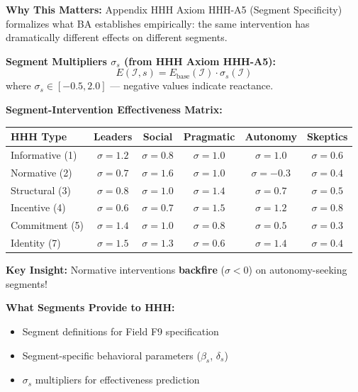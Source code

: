 \begin{tcolorbox}[colback=orange!5!white, colframe=orange!75!black,
    title=\textbf{Integration: Segments $\leftrightarrow$ HHH (Intervention Toolkit)}]

\textbf{Why This Matters:}
Appendix HHH Axiom HHH-A5 (Segment Specificity) formalizes what BA establishes empirically:
the same intervention has dramatically different effects on different segments.

\textbf{Segment Multipliers $\sigma_s$ (from HHH Axiom HHH-A5):}
\begin{equation}
E(\mathcal{I}, s) = E_{\text{base}}(\mathcal{I}) \cdot \sigma_s(\mathcal{I})
\end{equation}
where $\sigma_s \in [-0.5, 2.0]$ --- negative values indicate reactance.

\textbf{Segment-Intervention Effectiveness Matrix:}
\begin{center}
\renewcommand{\arraystretch}{1.2}
\footnotesize
\begin{tabular}{@{}lccccc@{}}
\toprule
\textbf{HHH Type} & \textbf{Leaders} & \textbf{Social} & \textbf{Pragmatic} & \textbf{Autonomy} & \textbf{Skeptics} \\
\midrule
Informative (1) & $\sigma=1.2$ & $\sigma=0.8$ & $\sigma=1.0$ & $\sigma=1.0$ & $\sigma=0.6$ \\
Normative (2) & $\sigma=0.7$ & $\sigma=1.6$ & $\sigma=1.0$ & $\sigma=-0.3$ & $\sigma=0.4$ \\
Structural (3) & $\sigma=0.8$ & $\sigma=1.0$ & $\sigma=1.4$ & $\sigma=0.7$ & $\sigma=0.5$ \\
Incentive (4) & $\sigma=0.6$ & $\sigma=0.7$ & $\sigma=1.5$ & $\sigma=1.2$ & $\sigma=0.8$ \\
Commitment (5) & $\sigma=1.4$ & $\sigma=1.0$ & $\sigma=0.8$ & $\sigma=0.5$ & $\sigma=0.3$ \\
Identity (7) & $\sigma=1.5$ & $\sigma=1.3$ & $\sigma=0.6$ & $\sigma=1.4$ & $\sigma=0.4$ \\
\bottomrule
\end{tabular}
\end{center}

\textbf{Key Insight:} Normative interventions \textbf{backfire} ($\sigma < 0$) on autonomy-seeking segments!

\textbf{What Segments Provide to HHH:}
\begin{itemize}[nosep]
\item Segment definitions for Field F9 specification
\item Segment-specific behavioral parameters ($\beta_s$, $\delta_s$)
\item $\sigma_s$ multipliers for effectiveness prediction
\end{itemize}


\end{tcolorbox}

